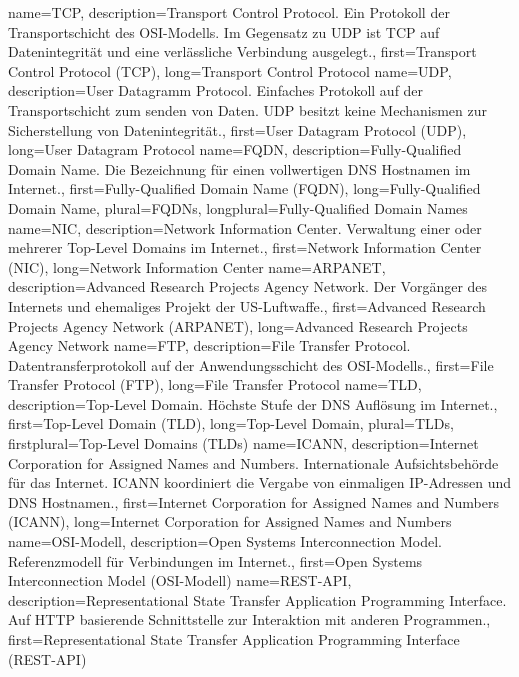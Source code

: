 {%
    name={TCP},
    description={Transport Control Protocol. Ein Protokoll der
    Transportschicht des OSI-Modells. Im Gegensatz zu UDP ist TCP auf
    Datenintegrität und eine verlässliche Verbindung ausgelegt.},
    first={Transport Control Protocol (TCP)},
    long={Transport Control Protocol}
}
{%
    name={UDP},
    description={User Datagramm Protocol. Einfaches Protokoll auf der
    Transportschicht zum senden von Daten. UDP besitzt keine Mechanismen
    zur Sicherstellung von Datenintegrität.},
    first={User Datagram Protocol (UDP)},
    long={User Datagram Protocol}
}
{%
    name={FQDN},
    description={Fully-Qualified Domain Name. Die Bezeichnung für einen
    vollwertigen DNS Hostnamen im Internet.},
    first={Fully-Qualified Domain Name (FQDN)},
    long={Fully-Qualified Domain Name},
    plural={FQDNs},
    longplural={Fully-Qualified Domain Names}
}
{%
    name={NIC},
    description={Network Information Center. Verwaltung einer oder
    mehrerer Top-Level Domains im Internet.},
    first={Network Information Center (NIC)},
    long={Network Information Center}
}
{%
    name={ARPANET},
    description={Advanced Research Projects Agency Network. Der
    Vorgänger des Internets und ehemaliges Projekt der US-Luftwaffe.},
    first={Advanced Research Projects Agency Network (ARPANET)},
    long={Advanced Research Projects Agency Network}
}
{%
    name={FTP},
    description={File Transfer Protocol. Datentransferprotokoll auf der
    Anwendungsschicht des OSI-Modells.},
    first={File Transfer Protocol (FTP)},
    long={File Transfer Protocol}
}
{%
    name={TLD},
    description={Top-Level Domain. Höchste Stufe der DNS Auflösung im
    Internet.},
    first={Top-Level Domain (TLD)},
    long={Top-Level Domain},
    plural={TLDs},
    firstplural={Top-Level Domains (TLDs)}
}
{%
    name={ICANN},
    description={Internet Corporation for Assigned Names and Numbers.
    Internationale Aufsichtsbehörde für das Internet. ICANN koordiniert
    die Vergabe von einmaligen IP-Adressen und DNS Hostnamen.},
    first={Internet Corporation for Assigned Names and Numbers (ICANN)},
    long={Internet Corporation for Assigned Names and Numbers}
}
{%
    name={OSI-Modell},
    description={Open Systems Interconnection Model. Referenzmodell für
    Verbindungen im Internet.},
    first={Open Systems Interconnection Model (OSI-Modell)}
}
{%
    name={REST-API},
    description={Representational State Transfer Application Programming
    Interface. Auf HTTP basierende Schnittstelle zur Interaktion mit
    anderen Programmen.},
    first={Representational State Transfer Application Programming Interface (REST-API)}
}
